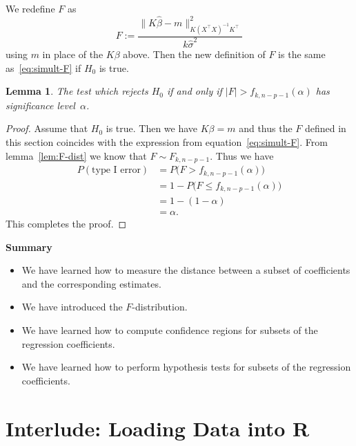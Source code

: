 \documentclass[
  a4paper,
]{article}
\providecommand{\tightlist}{%
  \setlength{\itemsep}{0pt}\setlength{\parskip}{0pt}}
\newtheorem{lemma}{Lemma}[section]
\theoremstyle{definition}
\theoremstyle{definition}
\theoremstyle{definition}
\theoremstyle{definition}
\theoremstyle{remark}
\begin{document}
We redefine \(F\) as
\begin{equation*}
  F
  := \frac{\bigl\| K \hat\beta - m \bigr\|_{K(X^\top X)^{-1} K^\top}^2}
          {k \hat\sigma^2}
\end{equation*}
using \(m\) in place of the \(K\beta\) above. Then the new definition of \(F\)
is the same as~\eqref{eq:simult-F} if \(H_0\) is true.

\begin{lemma}
\protect\hypertarget{lem:simult-test}{}\label{lem:simult-test}The test which rejects \(H_0\) if and only if \(|F| > f_{k,n-p-1}(\alpha)\)
has significance level~\(\alpha\).
\end{lemma}

\begin{proof}
Assume that \(H_0\) is true. Then we have \(K\beta = m\) and thus
the \(F\) defined in this section coincides with the expression from
equation~\eqref{eq:simult-F}. From lemma~\ref{lem:F-dist}
we know that \(F \sim F_{k, n-p-1}\). Thus we have
\begin{align*}
  P( \mbox{type I error} )
  &= P\bigl( F > f_{k,n-p-1}(\alpha) \bigr) \\
  &= 1 - P\bigl( F \leq f_{k,n-p-1}(\alpha) \bigr) \\
  &= 1 - (1 - \alpha) \\
  &= \alpha.
\end{align*}
This completes the proof.
\end{proof}

\textbf{Summary}

\begin{itemize}
\tightlist
\item
  We have learned how to measure the distance between
  a subset of coefficients and the corresponding estimates.
\item
  We have introduced the \(F\)-distribution.
\item
  We have learned how to compute confidence regions for subsets
  of the regression coefficients.
\item
  We have learned how to perform hypothesis tests for subsets
  of the regression coefficients.
\end{itemize}

\clearpage

\hypertarget{I02-read.csv}{%
\section*{Interlude: Loading Data into R}\label{I02-read.csv}}
\end{document}
